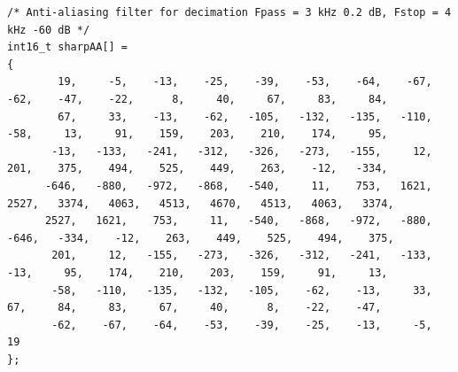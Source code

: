\documentclass[11pt,pdftex,portrait,letterpaper]{article}
\begin{document}
\begin{lstlisting}[caption={filters.h}, label=l:program4]
/* Anti-aliasing filter for decimation Fpass = 3 kHz 0.2 dB, Fstop = 4 kHz -60 dB */
int16_t sharpAA[] =
{
        19,     -5,    -13,    -25,    -39,    -53,    -64,    -67,    -62,    -47,    -22,      8,     40,     67,     83,     84,
        67,     33,    -13,    -62,   -105,   -132,   -135,   -110,    -58,     13,     91,    159,    203,    210,    174,     95,
       -13,   -133,   -241,   -312,   -326,   -273,   -155,     12,    201,    375,    494,    525,    449,    263,    -12,   -334,
      -646,   -880,   -972,   -868,   -540,     11,    753,   1621,   2527,   3374,   4063,   4513,   4670,   4513,   4063,   3374,
      2527,   1621,    753,     11,   -540,   -868,   -972,   -880,   -646,   -334,    -12,    263,    449,    525,    494,    375,
       201,     12,   -155,   -273,   -326,   -312,   -241,   -133,    -13,     95,    174,    210,    203,    159,     91,     13,
       -58,   -110,   -135,   -132,   -105,    -62,    -13,     33,     67,     84,     83,     67,     40,      8,    -22,    -47,
       -62,    -67,    -64,    -53,    -39,    -25,    -13,     -5,     19
};

\end{lstlisting}
\pagebreak
\end{document}
